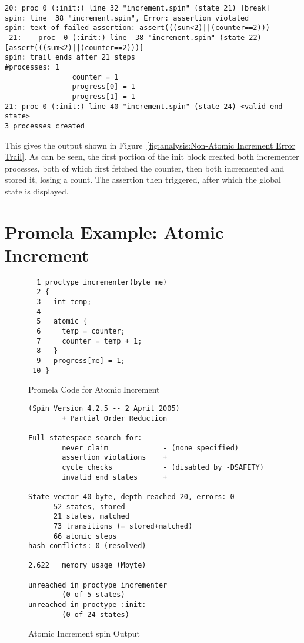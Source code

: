 \begin{figure*}[htbp]
{\begin{verbatim}
20: proc 0 (:init:) line 32 "increment.spin" (state 21)	[break]
spin: line  38 "increment.spin", Error: assertion violated
spin: text of failed assertion: assert(((sum<2)||(counter==2)))
 21:	proc  0 (:init:) line  38 "increment.spin" (state 22)	[assert(((sum<2)||(counter==2)))]
spin: trail ends after 21 steps
#processes: 1
                counter = 1
                progress[0] = 1
                progress[1] = 1
21: proc 0 (:init:) line 40 "increment.spin" (state 24) <valid end state>
3 processes created
\end{verbatim}
}
\caption{Non-Atomic Increment Error Trail}
\label{fig:analysis:Non-Atomic Increment Error Trail}
\end{figure*}

This gives the output shown in
Figure~\ref{fig:analysis:Non-Atomic Increment Error Trail}.
As can be seen, the first portion of the init block created both
incrementer processes, both of which first fetched the counter,
then both incremented and stored it, losing a count.
The assertion then triggered, after which the global state is displayed.

\section{Promela Example: Atomic Increment}
\label{app:formal:Promela Example: Atomic Increment}

\begin{figure}[htbp]
{ \scriptsize
\begin{verbatim}
  1 proctype incrementer(byte me)
  2 {
  3   int temp;
  4 
  5   atomic {
  6     temp = counter;
  7     counter = temp + 1;
  8   }
  9   progress[me] = 1;
 10 }
\end{verbatim}
}
\caption{Promela Code for Atomic Increment}
\label{fig:analysis:Promela Code for Atomic Increment}
\end{figure}

\begin{figure}[htbp]
{ \scriptsize
\begin{verbatim}
(Spin Version 4.2.5 -- 2 April 2005)
        + Partial Order Reduction

Full statespace search for:
        never claim             - (none specified)
        assertion violations    +
        cycle checks            - (disabled by -DSAFETY)
        invalid end states      +

State-vector 40 byte, depth reached 20, errors: 0
      52 states, stored
      21 states, matched
      73 transitions (= stored+matched)
      66 atomic steps
hash conflicts: 0 (resolved)

2.622   memory usage (Mbyte)

unreached in proctype incrementer
        (0 of 5 states)
unreached in proctype :init:
        (0 of 24 states)
\end{verbatim}
}
\caption{Atomic Increment spin Output}
\label{fig:analysis:Atomic Increment spin Output}
\end{figure}

